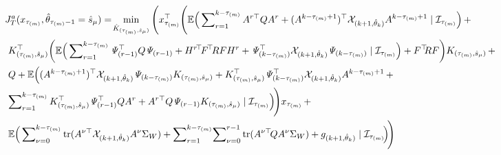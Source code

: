 \documentclass[journal,twoside,web]{ieeecolor}
\begin{document}
\begin{figure*}[ht]
\raggedright
\begin{align}\label{eq:cost-tau1}
\begin{aligned}
    & \text{\small $J_{T}^{a}(x_{\tau_{(m)}},\hat{\theta}_{\tau_{(m)}-1}=\hat{s}_{\mu}) = \!
    \min_{\hat{K}_{(\tau_{(m)},\hat{s}_{\mu})}} \Bigg( x_{\tau_{(m)}}^{\top} \Bigg(\mathbb{E} \Big( \sum\nolimits_{r=1}^{k-\tau_{(m)}} A^{r \top} Q A^{r}  + (A^{k-\tau_{(m)}+1})^{\top} \mathcal{X}_{(k+1,\hat{\theta}_k)} A^{k-\tau_{(m)}+1}\mid \mathcal{I}_{\tau_{(m)}} \Big) \,+ $}\\
    & ~ \text{\small $K_{(\tau_{(m)},\hat{s}_{\mu})}^{\top} \bigg( \mathbb{E} \Big( \sum\nolimits_{r=1}^{k-\tau_{(m)}} \mathit{\Psi}_{(r-1)}^{\top} Q \mathit{\Psi}_{(r-1)} + H^{r \!\top} \! F^{\!\top} \! R F H^{r} + \mathit{\Psi}_{(k-\tau_{(m)})}^{\top} \mathcal{X}_{(k+1,\hat{\theta}_k)} \mathit{\Psi}_{(k-\tau_{(m)})} \mid \mathcal{I}_{\tau_{(m)}} \Big) + F^{\top}\!\! R F \bigg) K_{(\tau_{(m)},\hat{s}_{\mu})} \,+ $} \\
    & ~ \text{\small  $Q + \mathbb{E} \Big( (A^{k-\tau_{(m)}+1})^{\top} \mathcal{X}_{(k+1,\hat{\theta}_k)} \mathit{\Psi}_{(k-\tau_{(m)})} K_{(\tau_{(m)},\hat{s}_{\mu})} + K_{(\tau_{(m)},\hat{s}_{\mu})}^{\top} \mathit{\Psi}_{(k-\tau_{(m)})} ^{\top} \mathcal{X}_{(k+1,\hat{\theta}_k)} A^{k-\tau_{(m)}+1} \,+$} \\
    & ~ \text{\small $ \sum\nolimits_{r=1}^{k-\tau_{(m)}}K_{(\tau_{(m)},\hat{s}_{\mu})}^{\top} \mathit{\Psi}_{(r-1)}^{\top} Q A^{r} +  A^{r \top} Q \mathit{\Psi}_{(r-1)} K_{(\tau_{(m)},\hat{s}_{\mu})} 
    \mid \mathcal{I}_{\tau_{(m)}} \Big) \! \Bigg) x_{\tau_{(m)}} \,+$} \\
    & ~ \text{\small $\mathbb{E} \Big( \sum\nolimits_{\nu=0}^{k-\tau_{(m)}} \mathop{\mathrm{tr}} (A^{\nu \top}  \mathcal{X}_{(k+1,\hat{\theta}_k)} A^{\nu} \Sigma_W) +\sum\nolimits_{r=1}^{k-\tau_{(m)}} \!\sum\nolimits_{\nu=0}^{r-1} \mathop{\mathrm{tr}} (A^{\nu \top} \! Q A^{\nu} \Sigma_W) + g_{(k+1,\hat{\theta}_k)} \mid \mathcal{I}_{\tau_{(m)}} \! \Big)\!\Bigg)$}      
\end{aligned}
\end{align}
\end{figure*}



% 
% 
\end{document}
